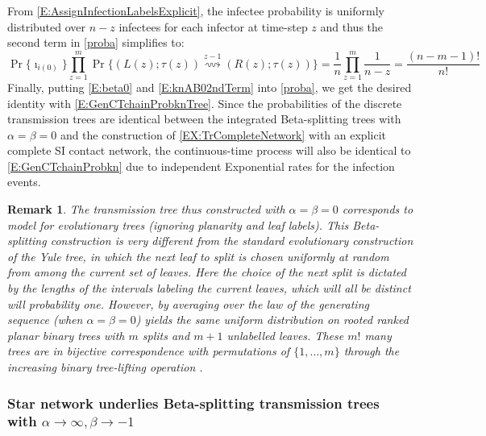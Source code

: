 \documentclass[review]{elsarticle}
\numberwithin{equation}{section}
\let\orgautoref\autoref
\providecommand{\Autorefs}
        {\def\equationautorefname{Equations}%
         \def\figureautorefname{Figures}%
         \def\subfigureautorefname{Figures}%
         \def\sectionautorefname{Sections}%
         \def\subsectionautorefname{Sections}%
         \def\subsubsectionautorefname{Sections}%
         \def\Itemautorefname{Items}%
         \def\tableautorefname{Tables}%
         \def\propositionautorefname{Propositions}%
         \def\theoremautorefname{Theorems}%
         \def\remarkautorefname{Remarks}%
         \def\proofofautorefname{Proofs}%
         \def\exampleautorefname{Examples}%
         \orgautoref}
\renewcommand{\autoref}
        {\def\equationautorefname{Eq.}%
         \def\figureautorefname{Fig.}%
         \def\subfigureautorefname{Fig.}%
         \def\sectionautorefname{Sect.}%
         \def\subsectionautorefname{Sect.}%
         \def\subsubsectionautorefname{Sect.}%
         \def\Itemautorefname{item}%
         \def\tableautorefname{Table}%
         \def\propositionautorefname{Prop.}%
         \def\corollaryautorefname{Corollary}%
         \def\theoremautorefname{Theorem}%
         \def\remarkautorefname{Remark}%
         \def\lemmaautorefname{Lemma}%
         \def\proofofautorefname{Proof}%
         \def\exampleautorefname{Example}%
         \orgautoref}
\newtheorem{remark}{Remark}%
\begin{document}
From \autoref{E:AssignInfectionLabelsExplicit}, the infectee probability is uniformly distributed over $n-z$ infectees for each infector at time-step $z$ and thus the second term in \autoref{proba} simplifies to:
\begin{equation}\label{E:knAB02ndTerm}
\Pr\{\imath_{i(0)}\} \prod_{z=1}^m \Pr\{(L(z);\tau(z)) \overset{z-1}{\rightsquigarrow} (R(z);\tau(z))\} = \frac{1}{n} \prod_{z=1}^m \frac{1}{n-z} = \frac{(n-m-1)!}{n!}
\end{equation}
Finally, putting \Autorefs{E:beta0} and \ref{E:knAB02ndTerm} into \autoref{proba}, we get the desired identity with \autoref{E:GenCTchainProbknTree}.  
Since the probabilities of the discrete transmission trees are identical between the integrated Beta-splitting trees with $\alpha=\beta=0$ and the construction of \autoref{EX:TrCompleteNetwork} with an explicit complete SI contact network, the continuous-time process will also be identical to \autoref{E:GenCTchainProbkn} due to independent Exponential rates for the infection events.

\begin{remark}
The transmission tree thus constructed with $\alpha=\beta=0$ corresponds to \cite{Yule1924} model for evolutionary trees (ignoring planarity and leaf labels).  
This Beta-splitting construction is very different from the standard evolutionary construction of the Yule tree, in which the next leaf to split is chosen uniformly at random from among the current set of leaves.  
Here the choice of the next split is dictated by the lengths of the intervals labeling the current leaves, which will all be distinct will probability one.  
However, by averaging over the law of the generating sequence (when $\alpha=\beta=0$) yields the same uniform distribution on rooted ranked planar binary trees with $m$ splits and $m+1$ unlabelled leaves.
These $m!$ many trees are in bijective correspondence with permutations of $\{1,\ldots,m\}$ through the {\em increasing binary tree-lifting} operation \cite[Ex 17, p.~132]{Flajolet}.
\end{remark}


\subsubsection{Star network underlies Beta-splitting transmission trees with $\alpha \to \infty, \beta \to -1$}\label{S:StarBeta}
\end{document}
